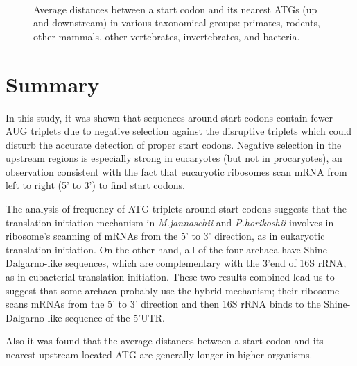 \begin{figure}
\begin{center}
\\
\end{center}
\caption{Average distances between a start codon and its nearest ATGs (up and
downstream) in various taxonomical groups: primates, rodents, other
mammals, other vertebrates, invertebrates, and bacteria.}
\label{atgdist}
\end{figure}



\section{Summary}

In this study, it was shown that sequences around start codons contain
fewer AUG triplets due to negative selection against the disruptive
triplets which could disturb the accurate detection of proper start
codons.  Negative selection in the upstream regions is especially
strong in eucaryotes (but not in procaryotes), an observation
consistent with the fact that eucaryotic ribosomes scan mRNA from left
to right (5' to 3') to find start codons.

The analysis of frequency of ATG triplets around start codons suggests
that the translation initiation mechanism in {\it M.jannaschii} and
{\it P.horikoshii} involves in ribosome's scanning of mRNAs from the
5' to 3' direction, as in eukaryotic translation initiation.  On the
other hand, all of the four archaea have Shine-Dalgarno-like
sequences, which are complementary with the 3'end of 16S rRNA, as in
eubacterial translation initiation\cite{arclabel_osada}.  These two
results combined lead us to suggest that some archaea probably use the
hybrid mechanism; their ribosome scans mRNAs from the 5' to 3'
direction and then 16S rRNA binds to the Shine-Dalgarno-like sequence
of the 5'UTR.

Also it was found that the average distances between a start codon and
its nearest upstream-located ATG are generally longer in higher
organisms.

